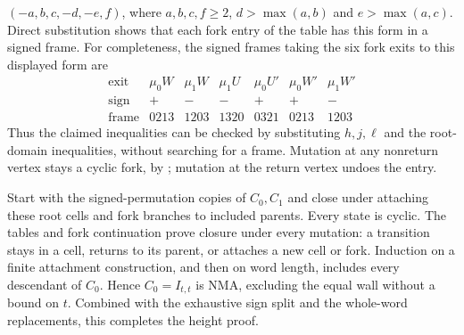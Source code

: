 $(-a,b,c,-d,-e,f)$, where $a,b,c,f\ge2$, $d>\max(a,b)$ and $e>\max(a,c)$. Direct substitution shows that each fork entry of the table has this form in a signed frame. For completeness, the signed frames taking the six fork exits to this displayed form are
\[
\begin{array}{c|rrrrrr}
\text{exit}&\mu_0W&\mu_1W&\mu_1U&\mu_0U'&\mu_0W'&\mu_1W'\\
\text{sign}&+&-&-&+&+&-\\
\text{frame}&0213&1203&1320&0321&0213&1203
\end{array}
\]
Thus the claimed inequalities can be checked by substituting $h,j,\ell$ and the root-domain inequalities, without searching for a frame. Mutation at any nonreturn vertex stays a cyclic fork, by \cite[Lemma~2.5]{Warkentin14}; mutation at the return vertex undoes the entry.

Start with the signed-permutation copies of $C_0,C_1$ and close under attaching these root cells and fork branches to included parents. Every state is cyclic. The tables and fork continuation prove closure under every mutation: a transition stays in a cell, returns to its parent, or attaches a new cell or fork. Induction on a finite attachment construction, and then on word length, includes every descendant of $C_0$. Hence $C_0=I_{t,t}$ is NMA, excluding the equal wall without a bound on $t$. Combined with the exhaustive sign split and the whole-word replacements, this completes the height proof.
